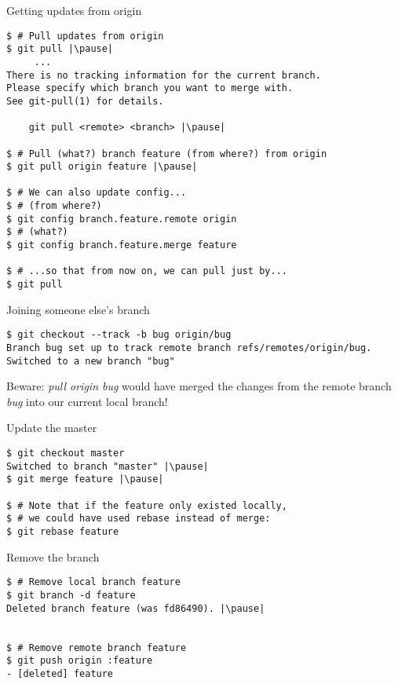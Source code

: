\begin{frame}[fragile]{Getting updates from origin}
	\begin{lstlisting}
$ # Pull updates from origin
$ git pull |\pause|
     ...
There is no tracking information for the current branch.
Please specify which branch you want to merge with.
See git-pull(1) for details.

    git pull <remote> <branch> |\pause|
    
$ # Pull (what?) branch feature (from where?) from origin
$ git pull origin feature |\pause|

$ # We can also update config...
$ # (from where?)
$ git config branch.feature.remote origin
$ # (what?)
$ git config branch.feature.merge feature

$ # ...so that from now on, we can pull just by...
$ git pull
	\end{lstlisting}
\end{frame}


\begin{frame}[fragile]{Joining someone else's branch}
	\begin{lstlisting}
$ git checkout --track -b bug origin/bug
Branch bug set up to track remote branch refs/remotes/origin/bug.
Switched to a new branch "bug"
	\end{lstlisting}
	
	\pause
	\begin{tiny}
	{\color{eclipsePurple} Beware:} \textit{pull origin bug} would have merged the changes from the remote branch \textit{bug} into our current local branch!
\end{tiny}
\end{frame}

\begin{frame}[fragile]{Update the master}
  	\begin{lstlisting}
$ git checkout master
Switched to branch "master" |\pause|
$ git merge feature |\pause|

$ # Note that if the feature only existed locally, 
$ # we could have used rebase instead of merge:
$ git rebase feature
	\end{lstlisting}
\end{frame}


\begin{frame}[fragile]{Remove the branch}
  	\begin{lstlisting}
$ # Remove local branch feature
$ git branch -d feature
Deleted branch feature (was fd86490). |\pause|


$ # Remove remote branch feature
$ git push origin :feature
- [deleted] feature
	\end{lstlisting}
\end{frame}


